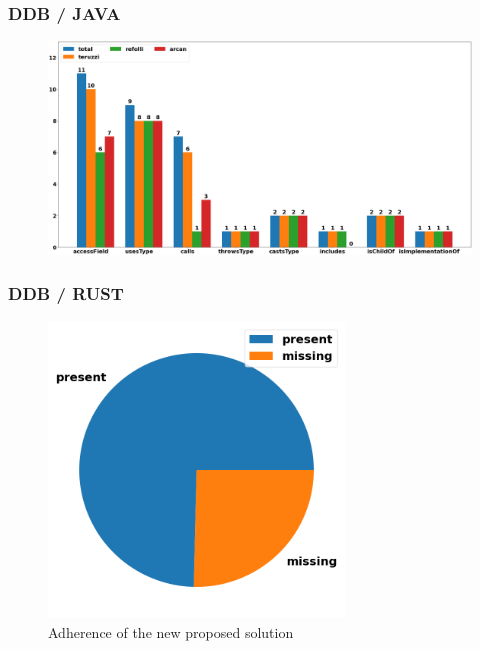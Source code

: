\documentclass[dvipsnames, 10pt, table]{beamer}
\begin{document}
\begin{frame}
  \frametitle{DDB / JAVA}
  \begin{figure}
    \begin{center}
      \includegraphics[width=1.0\textwidth]{figures/testing/bar-plot-java.png}
    \end{center}
  \end{figure}
\end{frame}

\begin{frame}
  \frametitle{DDB / RUST}
  \begin{figure}
    \begin{center}
      \includegraphics[width=0.7\textwidth]{figures/testing/pie-plot-rust-teruzzi.png}
      \caption{Adherence of the new proposed solution}
    \end{center}
  \end{figure}
\end{frame}
\end{document}
